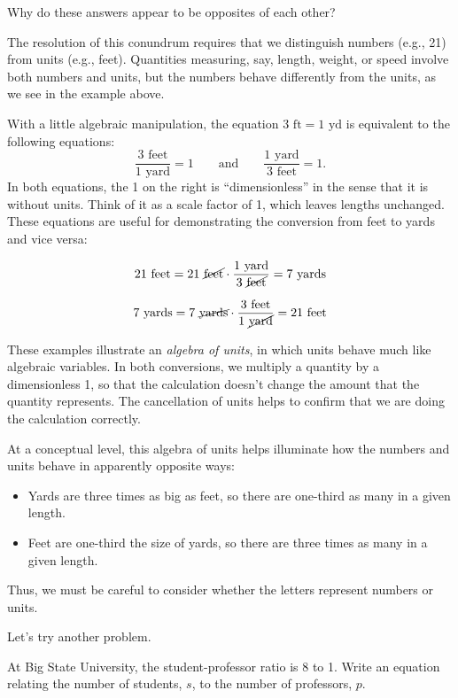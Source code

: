 \documentclass[nooutcomes]{ximera}
\begin{document}
Why do these answers appear to be opposites of each other?  

The resolution of this conundrum requires that we distinguish numbers (e.g., 21) from units (e.g., feet).  Quantities measuring, say, length, weight, or speed involve both numbers and units, but the numbers behave differently from the units, as we see in the example above.  

With a little algebraic manipulation, the equation $3\textrm{ ft} = 1 \textrm{ yd}$ is equivalent to the following equations:  
\[
\frac{3\textrm{ feet}}{1 \textrm{ yard}} = 1\qquad \textrm{and}\qquad \frac{1 \textrm{ yard}}{3\textrm{ feet}} = 1.
\]
In both equations, the 1 on the right is ``dimensionless'' in the sense that it is without units.  Think of it as a scale factor of 1, which leaves lengths unchanged.  These equations are useful for demonstrating the conversion from feet to yards and vice versa:  

\[
21\textrm{ feet} = 21\textrm{ \cancel{feet}} \cdot \frac{{1 \textrm{ yard}}}{3\textrm{ \cancel{feet}}} = 7\textrm{ yards}
\]

\[
7\textrm{ yards} = 7\textrm{ \cancel{yards}} \cdot \frac{{3 \textrm{ feet}}}{1\textrm{ \cancel{yard}}} = 
 21\textrm{ feet}
\]

These examples illustrate an \emph{algebra of units}, in which units behave much like algebraic variables.  In both conversions, we multiply a quantity by a dimensionless 1, so that the calculation doesn't change the amount that the quantity represents.  The cancellation of units helps to confirm that we are doing the calculation correctly.  

At a conceptual level, this algebra of units helps illuminate how the numbers and units behave in apparently opposite ways:  

\begin{itemize}
\item Yards are three times as big as feet, so there are one-third as many in a given length.  
\item Feet are one-third the size of yards, so there are three times as many in a given length.  
\end{itemize}

Thus, we must be careful to consider whether the letters represent numbers or units.  

Let's try another problem.  

\begin{question}
At Big State University, the student-professor ratio is 8 to 1.  Write an equation relating the number of students, $s$, to the number of professors, $p$.  
\end{question}
\end{document}
